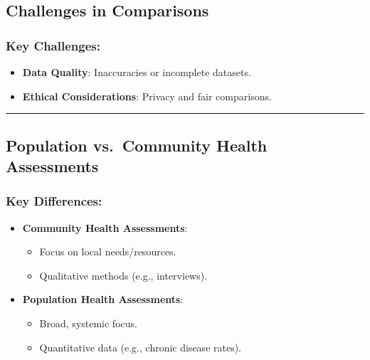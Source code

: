 \documentclass[
  letterpaper,
  DIV=11,
  numbers=noendperiod]{scrartcl}
\providecommand{\tightlist}{%
  \setlength{\itemsep}{0pt}\setlength{\parskip}{0pt}}\usepackage{longtable,booktabs,array}
\begin{document}
\hypertarget{challenges-in-comparisons}{%
\subsection{\texorpdfstring{{\textbf{Challenges in
Comparisons}}}{Challenges in Comparisons}}\label{challenges-in-comparisons}}

\hypertarget{key-challenges}{%
\subsubsection{\texorpdfstring{{\textbf{Key
Challenges}}:}{Key Challenges:}}\label{key-challenges}}

\begin{itemize}
\tightlist
\item
  \textbf{Data Quality}: Inaccuracies or incomplete datasets.\\
\item
  \textbf{Ethical Considerations}: Privacy and fair comparisons.
\end{itemize}

\begin{center}\rule{0.5\linewidth}{0.5pt}\end{center}

\hypertarget{population-vs.-community-health-assessments}{%
\subsection{\texorpdfstring{{\textbf{Population vs.~Community Health
Assessments}}}{Population vs.~Community Health Assessments}}\label{population-vs.-community-health-assessments}}

\hypertarget{key-differences}{%
\subsubsection{\texorpdfstring{{\textbf{Key
Differences}}:}{Key Differences:}}\label{key-differences}}

\begin{itemize}
\tightlist
\item
  \textbf{Community Health Assessments}:

  \begin{itemize}
  \tightlist
  \item
    Focus on local needs/resources.
  \item
    Qualitative methods (e.g., interviews).
  \end{itemize}
\item
  \textbf{Population Health Assessments}:

  \begin{itemize}
  \tightlist
  \item
    Broad, systemic focus.\\
  \item
    Quantitative data (e.g., chronic disease rates).
  \end{itemize}
\end{itemize}
\end{document}
